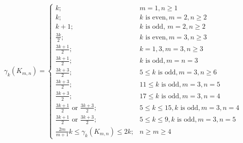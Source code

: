 \documentclass[10pt,a4paper]{amsart}
\begin{document}
\begin{theorem}\label{thm4}
$$\gamma_k(K_{m,n})=\left\lbrace \begin{array}{ll}
k; & m=1, n\geq 1 \\ 
k; & k \textrm{ is even}, m=2, n\geq 2 \\
k+1; &  k \textrm{ is odd, } m=2, n\geq 2 \\
\frac{3k}{2}; & k \textrm{ is even}, m=3, n\geq 3 \\
\frac{3k+1}{2}; & k=1,3 , m=3, n\geq 3 \\  
\frac{3k+1}{2}; & k \textrm{ is odd}, m=n=3 \\
\frac{3k+3}{2}; & 5\leq k \textrm{ is odd}, m=3, n\geq 6 \\
\frac{3k+3}{2}; & 11\leq k \textrm{ is odd}, m=3, n=5 \\
\frac{3k+3}{2}; & 17\leq k \textrm{ is odd}, m=3, n=4 \\
\frac{3k+1}{2} \textrm{ or } \frac{3k+3}{2}; & 5\leq k \leq 15, k \textrm{ is odd}, m=3, n=4 \\
\frac{3k+1}{2} \textrm{ or } \frac{3k+3}{2}; & 5\leq k \leq 9, k \textrm{ is odd}, m=3, n=5 \\
\frac{2m}{m+1}k \leq \gamma_k(K_{m,n})\leq 2k; & n\geq m\geq 4 
\end{array} \right.$$
\end{theorem}
\end{document}

